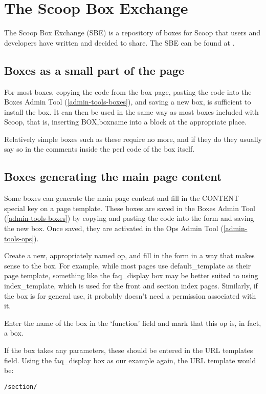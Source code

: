 \section{The Scoop Box Exchange}
\label{sbe}

The Scoop Box Exchange (SBE) is a repository of boxes for Scoop that users and developers have written and decided to share. The SBE can be found at .

\subsection{Boxes as a small part of the page}
\label{sbe-box-normal}

For most boxes, copying the code from the box page, pasting the code into the Boxes Admin Tool (\ref{admin-tools-boxes}), and saving a new box, is sufficient to install the box. It can then be used in the same way as most boxes included with Scoop, that is, inserting \latexhtml{$\vert$}{|}BOX,boxname\latexhtml{$\vert$}{|} into a block at the appropriate place.

Relatively simple boxes such as these require no more, and if they do they usually say so in the comments inside the perl code of the box itself.

\subsection{Boxes generating the main page content}
\label{sbe-box-op}

Some boxes can generate the main page content and fill in the CONTENT special key on a page template. These boxes are saved in the Boxes Admin Tool (\ref{admin-tools-boxes}) by copying and pasting the code into the form and saving the new box. Once saved, they are activated in the Ops Admin Tool (\ref{admin-tools-ops}).

Create a new, appropriately named op, and fill in the form in a way that makes sense to the box. For example, while most pages use default\_template as their page template, something like the faq\_display box may be better suited to using index\_template, which is used for the front and section index pages. Similarly, if the box is for general use, it probably doesn't need a permission associated with it.

Enter the name of the box in the `function' field and mark that this op is, in fact, a box.

If the box takes any parameters, these should be entered in the URL templates field. Using the faq\_display box as our example again, the URL template would be:
\begin{verbatim}
/section/
\end{verbatim}


